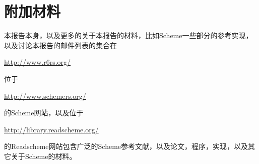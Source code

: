 \chapter{附加材料}
\label{additionalmaterialappendix}

本报告本身，以及更多的关于本报告的材料，比如Scheme一些部分的参考实现，以及讨论本报告的邮件列表的集合在
\begin{center}
\url{http://www.r6rs.org/}
\end{center}

位于
\begin{center}
\url{http://www.schemers.org/}
\end{center}
的Scheme网站，以及位于
\begin{center}
\url{http://library.readscheme.org/}
\end{center}
的Readscheme网站包含广泛的Scheme参考文献，以及论文，程序，实现，以及其它关于Scheme的材料。


